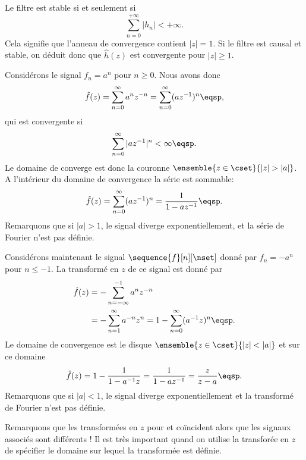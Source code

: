 Le filtre est stable si et seulement si
\[
\sum_{n=0}^{+\infty} |h_n| < +\infty .
\]
Cela signifie que l'anneau de convergence contient $|z| = 1$.
Si le filtre est causal et stable, on d\'eduit donc que
$\hat h(z)$ est convergente pour $|z| \geq 1$.
\begin{example}
\label{exam:exponential-1}
Consid\'erons le signal $f_n= a^n$ pour $n \geq 0$. Nous avons donc
\[
\hat{f}(z) = \sum_{n=0}^\infty a^n z^{-n} = \sum_{n=0}^{\infty} (a z^{-1})^n \eqsp,
\]
qui est convergente si
\[
\sum_{n=0}^{\infty} |a z^{-1}|^n < \infty \eqsp.
\]
Le domaine de converge est donc la couronne $\ensemble{z \in \cset}{|z| > |a|}$. A l'int\'erieur du domaine de convergence la série est sommable:
\[
\hat{f}(z)= \sum_{n=0}^\infty (a z^{-1})^n = \frac{1}{1 - a z^{-1}} \eqsp.
\]
Remarquons que si $|a| > 1$, le signal diverge exponentiellement, et la s\'erie de Fourier n'est pas d\'efinie.
\end{example}
\begin{example}
\label{exam:exponential-2}
Consid\'erons maintenant le signal $\sequence{f}[n][\nset]$ donn\'e par $f_n = - a^n$ pour $n \leq -1$. La transform\'e en $z$ de ce signal est donn\'e par
\begin{align*}
\hat{f}(z)
&= - \sum_{n=-\infty}^{-1} a^n z^{-n} \\
&= - \sum_{n=1}^\infty a^{-n} z^n = 1 - \sum_{n=0}^\infty (a^{-1} z)^n \eqsp.
\end{align*}
Le domaine de convergence est le disque $\ensemble{z \in \cset}{|z| < |a|}$ et sur ce domaine
\[
\hat{f}(z)= 1 - \frac{1}{1-a^{-1} z}= \frac{1}{1-a z^{-1}}= \frac{z}{z-a} \eqsp.
\]
Remarquons que si $|a| < 1$, le signal diverge exponentiellement et la transform\'e de Fourier n'est pas d\'efinie.
\end{example}
Remarquons que les transformées en $z$ pour  et  co\"incident alors que les signaux associ\'es sont diff\'erents ! Il est tr\`es important quand on utilise la transfor\'ee en $z$ de sp\'ecifier le domaine sur lequel la transform\'ee est d\'efinie.

